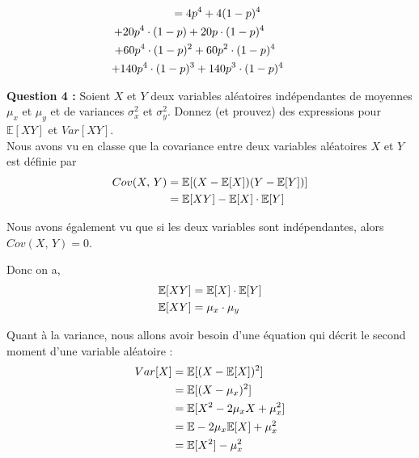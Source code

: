 \documentclass[10pt,a4paper]{article}
\begin{document}
	\vspace{-1cm}
	\begin{multline}
		\hspace{.45cm} = 4p^4 + 4(1 - p)^4 \\ + 20p^4 \cdot (1 - p) + 20p \cdot (1 - p)^4 \hspace{1.3cm} \\ + 60p^4 \cdot (1 - p)^2 + 60p^2 \cdot (1 - p)^4 \hspace{.95cm} \\ + 140p^4 \cdot (1 - p)^3 + 140p^3 \cdot (1 - p)^4 \hspace{.8cm} \notag
	\end{multline}

	\vspace{.3cm}
	\textbf{Question 4 :} Soient $X$ et $Y$ deux variables aléatoires indépendantes de moyennes $\mu_x$ et $\mu_y$ et de variances $\sigma^2_x$ et $\sigma^2_y$. Donnez (et prouvez) des expressions pour \(\mathbb{E}[XY]\) et \(Var[XY]\). \\

	Nous avons vu en classe que la covariance entre deux variables aléatoires $X$ et $Y$ est définie par 
	\begin{align}
		Cov(X,\, Y) &= \mathbb{E}[(X - \mathbb{E}[X])(Y - \mathbb{E}[Y])] \notag \\
		&= \mathbb{E}[XY] - \mathbb{E}[X] \cdot \mathbb{E}[Y] \notag
	\end{align}

	Nous avons également vu que si les deux variables sont indépendantes, alors \(Cov(X,\, Y) = 0\).

	\vspace{.2cm}
	Donc on a,
	\begin{align}
		\mathbb{E}[XY] &= \mathbb{E}[X] \cdot \mathbb{E}[Y] \notag \\
		\mathbb{E}[XY] &= \mu_x \cdot \mu_y \notag
	\end{align}

	\vspace{.2cm}
	Quant à la variance, nous allons avoir besoin d'une équation qui décrit le second moment d'une variable aléatoire :
	\begin{align}
		Var[X] &= \mathbb{E}[(X - \mathbb{E}[X])^2] \notag \\
		&= \mathbb{E}[(X - \mu_x)^2] \notag \\
		&= \mathbb{E}[X^2 - 2\mu_x X + \mu_x^2] \notag \\
		&= \mathbb{E} - 2\mu_x\mathbb{E}[X] + \mu_x^2 \notag \\
		&= \mathbb{E}[X^2] - \mu_x^2 \notag
	\end{align}
\end{document}
